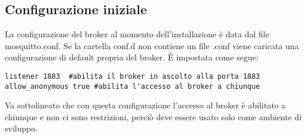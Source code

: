 \subsection{Configurazione iniziale}
La configurazione del broker al momento dell'installazione è data dal file mosquitto.conf.
\newline
Se la cartella conf.d non contiene un file .conf viene caricata una configurazione di default
propria del broker. È impostata come segue:
\begin{lstlisting}[language=text]
listener 1883  #abilita il broker in ascolto alla porta 1883
allow_anonymous true #abilita l'accesso al broker a chiunque
\end{lstlisting}
Va sottolineato che con questa configurazione l'accesso al broker è abilitato a chiunque
e non ci sono restrizioni, perciò deve essere usato solo come ambiente di sviluppo.

